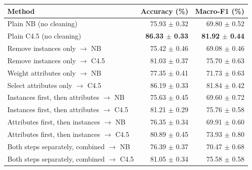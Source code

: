 \begin{tabular}{lrr}
\toprule
Method & Accuracy (\%) & Macro-F1 (\%) \\
\midrule
Plain NB (no cleaning) & 75.93 $\pm$ 0.32 & 69.80 $\pm$ 0.52 \\
Plain C4.5 (no cleaning) & \textbf{86.33 $\pm$ 0.33} & \textbf{81.92 $\pm$ 0.44} \\
Remove instances only $\to$ NB & 75.42 $\pm$ 0.46 & 69.08 $\pm$ 0.46 \\
Remove instances only $\to$ C4.5 & 81.03 $\pm$ 0.37 & 75.70 $\pm$ 0.63 \\
Weight attributes only $\to$ NB & 77.35 $\pm$ 0.41 & 71.73 $\pm$ 0.63 \\
Select attributes only $\to$ C4.5 & 86.19 $\pm$ 0.33 & 81.84 $\pm$ 0.42 \\
Instances first, then attributes $\to$ NB & 75.63 $\pm$ 0.45 & 69.60 $\pm$ 0.72 \\
Instances first, then attributes $\to$ C4.5 & 81.21 $\pm$ 0.29 & 75.76 $\pm$ 0.58 \\
Attributes first, then instances $\to$ NB & 76.35 $\pm$ 0.34 & 69.91 $\pm$ 0.60 \\
Attributes first, then instances $\to$ C4.5 & 80.89 $\pm$ 0.45 & 73.93 $\pm$ 0.80 \\
Both steps separately, combined $\to$ NB & 76.39 $\pm$ 0.37 & 70.47 $\pm$ 0.68 \\
Both steps separately, combined $\to$ C4.5 & 81.05 $\pm$ 0.34 & 75.58 $\pm$ 0.58 \\
\bottomrule
\end{tabular}

